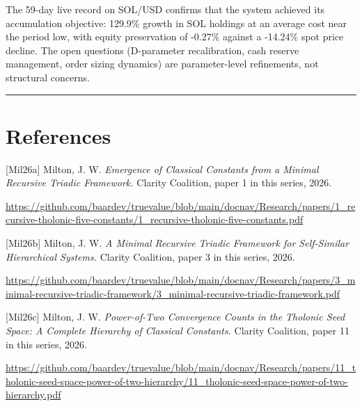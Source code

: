 \documentclass[12pt]{article}
\begin{document}
The 59-day live record on SOL/USD confirms that the system achieved its
accumulation objective: 129.9\% growth in SOL holdings at an average
cost near the period low, with equity preservation of -0.27\% against a
-14.24\% spot price decline. The open questions (D-parameter
recalibration, cash reserve management, order sizing dynamics) are
parameter-level refinements, not structural concerns.

\begin{center}\rule{0.5\linewidth}{0.5pt}\end{center}

\section{References}\label{references}

{[}Mil26a{]} Milton, J. W. \emph{Emergence of Classical Constants from a
Minimal Recursive Triadic Framework.} Clarity Coalition, paper 1 in this
series, 2026.

\url{https://github.com/baardev/truevalue/blob/main/docnav/Research/papers/1_recursive-tholonic-five-constants/1_recursive-tholonic-five-constants.pdf}

{[}Mil26b{]} Milton, J. W. \emph{A Minimal Recursive Triadic Framework
for Self-Similar Hierarchical Systems.} Clarity Coalition, paper 3 in
this series, 2026.

\url{https://github.com/baardev/truevalue/blob/main/docnav/Research/papers/3_minimal-recursive-triadic-framework/3_minimal-recursive-triadic-framework.pdf}

{[}Mil26c{]} Milton, J. W. \emph{Power-of-Two Convergence Counts in the
Tholonic Seed Space: A Complete Hierarchy of Classical Constants.}
Clarity Coalition, paper 11 in this series, 2026.

\url{https://github.com/baardev/truevalue/blob/main/docnav/Research/papers/11_tholonic-seed-space-power-of-two-hierarchy/11_tholonic-seed-space-power-of-two-hierarchy.pdf}
\end{document}
